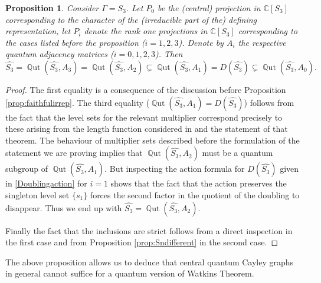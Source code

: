 \documentclass[12pt]{amsart}
\newtheorem{prop}[thm]{Proposition}
\theoremstyle{definition}
\theoremstyle{definition}
\theoremstyle{definition}
\theoremstyle{definition}
\DeclareMathOperator{\Qut}{\mathbb{Q}ut}
\newcommand{\C}{\mathbb{C}}
\numberwithin{equation}{section}
\begin{document}
\begin{prop}\label{prop:S3}
Consider $\Gamma=S_3$. Let $P_0$ be the (central) projection in $\C[S_3]$ corresponding to the character of the (irreducible part of the) defining representation,  let $P_i$ denote the rank one projections in $\C[S_3]$ corresponding to the cases listed before the proposition ($i=1,2,3$). Denote by $A_i$ the respective quantum adjacency matrices  ($i=0,1,2,3$).
Then 
\[ \widehat{S_3} = \Qut(\widehat{S_3}, A_3) = \Qut(\widehat{S_3}, A_2)  \subsetneq \Qut(\widehat{S_3}, A_1) = D(\widehat{S_3}) \subsetneq \Qut(\widehat{S_3}, A_0).  \]
\end{prop}
\begin{proof}
The first equality is a consequence of the discussion before Proposition \ref{prop:faithfulirrep}. The third equality ($\Qut(\widehat{S_3}, A_1) = D(\widehat{S_3})$) follows from the fact that the level sets for the relevant multiplier correspond precisely to these arising from the length function considered in \cite[Theorem 4.2]{BhS10} and the statement of that theorem.
The behaviour of multiplier sets described before the formulation of the statement we are proving implies that $\Qut(\widehat{S_3}, A_2)$ must be a quantum subgroup of $\Qut(\widehat{S_3}, A_1)$. But inspecting the action formula for $D(\widehat{S_3})$ given in \eqref{Doublingaction} for $i=1$ shows that the fact that the action preserves the singleton level set $\{s_1\}$ forces the second factor in the quotient of the doubling to disappear. Thus we end up with $\widehat{S_3} = \Qut(\widehat{S_3}, A_2)$.



Finally the fact that the inclusions are strict follows from a direct inspection in the first case and from Proposition \ref{prop:Sndifferent} in the second case.
\end{proof}

The above proposition allows us to deduce that central quantum Cayley graphs in general cannot suffice for a quantum version of Watkins Theorem. 
\end{document}
